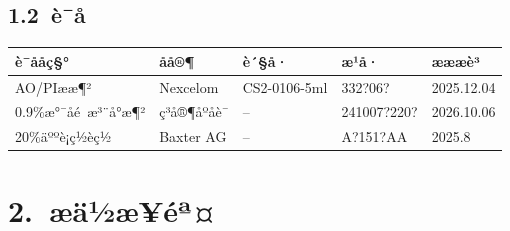\documentclass[UTF8,10pt,a4paper,fontset=fandol]{ctexart}
\newcommand{\fieldvalue}[1]{#1}
\newcommand{\handwritten}[1]{#1}
\begin{document}
\begin{center}
\begin{center}
\subsection*{1.2\ è¯å}

\noindent
\small
\begin{tabularx}{\textwidth}{|p{3.0cm}|p{2.4cm}|p{2.7cm}|p{2.7cm}|X|}
\hline
è¯ååç§° & åå®¶ & è´§å· & æ¹å· & æææè³\\
\hline
\fieldvalue{AO/PIææ¶²} &
\fieldvalue{Nexcelom} &
\fieldvalue{CS2-0106-5ml} &
\fieldvalue{\handwritten{332?06?}} &
\fieldvalue{\handwritten{2025.12.04}}\\
\hline
\fieldvalue{0.9\%æ°¯åé æ³¨å°æ¶²} &
\fieldvalue{ç³å®¶åºåè¯} &
\fieldvalue{--} &
\fieldvalue{\handwritten{241007?220?}} &
\fieldvalue{\handwritten{2026.10.06}}\\
\hline
\fieldvalue{20\%äººè¡ç½èç½} &
\fieldvalue{Baxter AG} &
\fieldvalue{--} &
\fieldvalue{\handwritten{A?151?AA}} &
\fieldvalue{\handwritten{2025.8}}\\
\hline
\end{tabularx}
\normalsize

\section*{2.\ æä½æ­¥éª¤}


\end{center}
\end{center}
\end{document}
